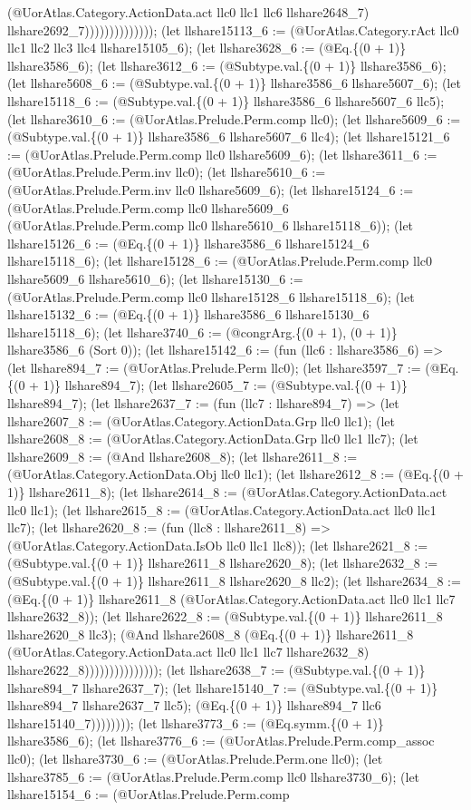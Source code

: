 \documentclass[11pt]{article}
\begin{document}
(@UorAtlas.Category.ActionData.act llc0 llc1 llc6 llshare2648\_7) llshare2692\_7)))))))))))))); (let llshare15113\_6 := (@UorAtlas.Category.rAct llc0 llc1 llc2 llc3 llc4 llshare15105\_6); (let llshare3628\_6 := (@Eq.\{(0 + 1)\} llshare3586\_6); (let llshare3612\_6 := (@Subtype.val.\{(0 + 1)\} llshare3586\_6); (let llshare5608\_6 := (@Subtype.val.\{(0 + 1)\} llshare3586\_6 llshare5607\_6); (let llshare15118\_6 := (@Subtype.val.\{(0 + 1)\} llshare3586\_6 llshare5607\_6 llc5); (let llshare3610\_6 := (@UorAtlas.Prelude.Perm.comp llc0); (let llshare5609\_6 := (@Subtype.val.\{(0 + 1)\} llshare3586\_6 llshare5607\_6 llc4); (let llshare15121\_6 := (@UorAtlas.Prelude.Perm.comp llc0 llshare5609\_6); (let llshare3611\_6 := (@UorAtlas.Prelude.Perm.inv llc0); (let llshare5610\_6 := (@UorAtlas.Prelude.Perm.inv llc0 llshare5609\_6); (let llshare15124\_6 := (@UorAtlas.Prelude.Perm.comp llc0 llshare5609\_6 (@UorAtlas.Prelude.Perm.comp llc0 llshare5610\_6 llshare15118\_6)); (let llshare15126\_6 := (@Eq.\{(0 + 1)\} llshare3586\_6 llshare15124\_6 llshare15118\_6); (let llshare15128\_6 := (@UorAtlas.Prelude.Perm.comp llc0 llshare5609\_6 llshare5610\_6); (let llshare15130\_6 := (@UorAtlas.Prelude.Perm.comp llc0 llshare15128\_6 llshare15118\_6); (let llshare15132\_6 := (@Eq.\{(0 + 1)\} llshare3586\_6 llshare15130\_6 llshare15118\_6); (let llshare3740\_6 := (@congrArg.\{(0 + 1), (0 + 1)\} llshare3586\_6 (Sort 0)); (let llshare15142\_6 := (fun (llc6 : llshare3586\_6) => (let llshare894\_7 := (@UorAtlas.Prelude.Perm llc0); (let llshare3597\_7 := (@Eq.\{(0 + 1)\} llshare894\_7); (let llshare2605\_7 := (@Subtype.val.\{(0 + 1)\} llshare894\_7); (let llshare2637\_7 := (fun (llc7 : llshare894\_7) => (let llshare2607\_8 := (@UorAtlas.Category.ActionData.Grp llc0 llc1); (let llshare2608\_8 := (@UorAtlas.Category.ActionData.Grp llc0 llc1 llc7); (let llshare2609\_8 := (@And llshare2608\_8); (let llshare2611\_8 := (@UorAtlas.Category.ActionData.Obj llc0 llc1); (let llshare2612\_8 := (@Eq.\{(0 + 1)\} llshare2611\_8); (let llshare2614\_8 := (@UorAtlas.Category.ActionData.act llc0 llc1); (let llshare2615\_8 := (@UorAtlas.Category.ActionData.act llc0 llc1 llc7); (let llshare2620\_8 := (fun (llc8 : llshare2611\_8) => (@UorAtlas.Category.ActionData.IsOb llc0 llc1 llc8)); (let llshare2621\_8 := (@Subtype.val.\{(0 + 1)\} llshare2611\_8 llshare2620\_8); (let llshare2632\_8 := (@Subtype.val.\{(0 + 1)\} llshare2611\_8 llshare2620\_8 llc2); (let llshare2634\_8 := (@Eq.\{(0 + 1)\} llshare2611\_8 (@UorAtlas.Category.ActionData.act llc0 llc1 llc7 llshare2632\_8)); (let llshare2622\_8 := (@Subtype.val.\{(0 + 1)\} llshare2611\_8 llshare2620\_8 llc3); (@And llshare2608\_8 (@Eq.\{(0 + 1)\} llshare2611\_8 (@UorAtlas.Category.ActionData.act llc0 llc1 llc7 llshare2632\_8) llshare2622\_8))))))))))))))); (let llshare2638\_7 := (@Subtype.val.\{(0 + 1)\} llshare894\_7 llshare2637\_7); (let llshare15140\_7 := (@Subtype.val.\{(0 + 1)\} llshare894\_7 llshare2637\_7 llc5); (@Eq.\{(0 + 1)\} llshare894\_7 llc6 llshare15140\_7)))))))); (let llshare3773\_6 := (@Eq.symm.\{(0 + 1)\} llshare3586\_6); (let llshare3776\_6 := (@UorAtlas.Prelude.Perm.comp\_assoc llc0); (let llshare3730\_6 := (@UorAtlas.Prelude.Perm.one llc0); (let llshare3785\_6 := (@UorAtlas.Prelude.Perm.comp llc0 llshare3730\_6); (let llshare15154\_6 := (@UorAtlas.Prelude.Perm.comp 
\end{document}
